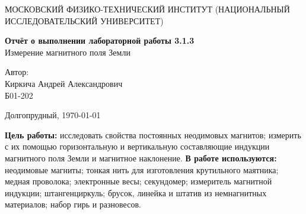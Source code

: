 



\begin{titlepage}
\begin{center}
{\large МОСКОВСКИЙ ФИЗИКО-ТЕХНИЧЕСКИЙ ИНСТИТУТ (НАЦИОНАЛЬНЫЙ ИССЛЕДОВАТЕЛЬСКИЙ УНИВЕРСИТЕТ)}
\end{center}
	
\vspace{4.5cm}
{\huge
\begin{center}
{\bf Отчёт о выполнении лабораторной работы 3.1.3}\\	
Измерение магнитного поля Земли		
\end{center}
}
\vspace{2cm}
\begin{flushright}
{\LARGE Автор:\\ Киркича Андрей Александрович \\
\vspace{0.2cm}
Б01-202}
\end{flushright}
\vspace{4cm}
\begin{center}
Долгопрудный, \today
\end{center}
\end{titlepage}
\n
	\textbf{Цель работы: }
	исследовать свойства постоянных неодимовых магнитов; измерить с их помощью горизонтальную и вертикальную составляющие индукции магнитного поля Земли и магнитное наклонение.
	\n\n
	\textbf{В работе используются: }
	неодимовые магниты; тонкая нить для изготовления крутильного маятника; медная проволока; электронные весы; секундомер; измеритель магнитной индукции; штангенциркуль; брусок, линейка и штатив из немнагнитных материалов; набор гирь и разновесов.
